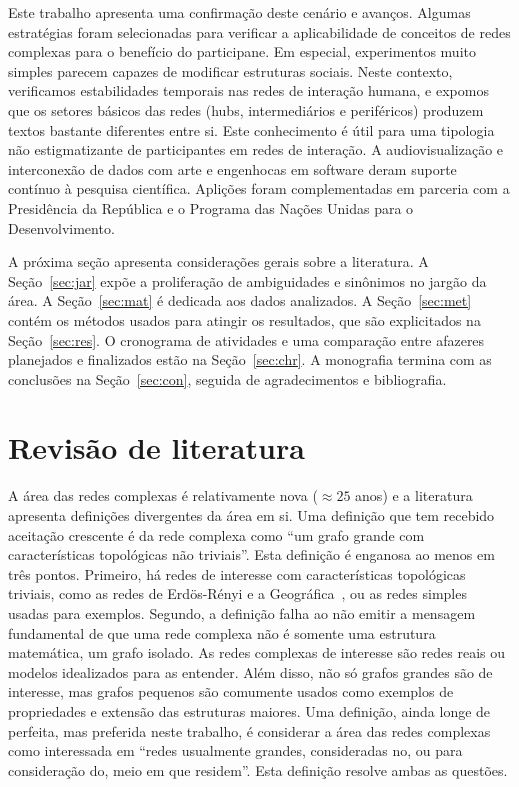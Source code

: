 \documentclass[a4paper,openright,12pt]{report} %
\begin{document}
Este trabalho apresenta uma confirmação deste cenário e avanços.
Algumas estratégias foram selecionadas para verificar a aplicabilidade
de conceitos de redes complexas para o benefício do participane.
Em especial, experimentos muito simples parecem capazes de modificar
estruturas sociais. Neste contexto, verificamos estabilidades temporais
nas redes de interação humana, e expomos que os setores básicos
das redes (hubs, intermediários e periféricos)
produzem textos bastante diferentes entre si.
Este conhecimento é útil para uma tipologia não estigmatizante
de participantes em redes de interação.
A audiovisualização e interconexão de dados com arte e engenhocas
em software deram suporte contínuo à pesquisa científica.
Aplições foram complementadas em parceria com a Presidência da República
e o Programa das Nações Unidas para o Desenvolvimento.

A próxima seção apresenta considerações gerais sobre a literatura.
A Seção~\ref{sec:jar} expõe a proliferação de ambiguidades e sinônimos
no jargão da área.
A Seção~\ref{sec:mat} é dedicada aos dados analizados.
A Seção~\ref{sec:met} contém os métodos usados para atingir os resultados, que são explicitados na Seção~\ref{sec:res}. O cronograma de atividades e uma comparação entre afazeres planejados e finalizados
estão na Seção~\ref{sec:chr}.
A monografia termina com as conclusões na Seção~\ref{sec:con}, seguida de agradecimentos e bibliografia.

\section{Revisão de literatura}
A área das redes complexas é relativamente nova ($\approx 25$ anos)
e a literatura apresenta definições divergentes da área em si.
Uma definição que tem recebido aceitação crescente
é da rede complexa como ``um grafo grande com características topológicas
não triviais''. Esta definição é enganosa ao menos em três pontos.
Primeiro, há redes de interesse com características topológicas triviais, como as redes de Erdös-Rényi e a Geográfica~\cite{newman}, ou as redes simples usadas para exemplos.
Segundo, a definição falha ao não emitir a mensagem fundamental de que uma rede complexa não é somente uma estrutura matemática, um grafo isolado. As redes complexas de interesse são redes reais ou modelos idealizados para as entender.
Além disso, não só grafos grandes são de interesse, mas grafos pequenos são comumente usados como exemplos de propriedades e extensão das estruturas maiores.
Uma definição, ainda longe de perfeita, mas preferida neste trabalho, é considerar a área das redes complexas como interessada em
``redes usualmente grandes, consideradas no, ou para consideração do,
meio em que residem''.
Esta definição resolve ambas as questões.
\end{document}
